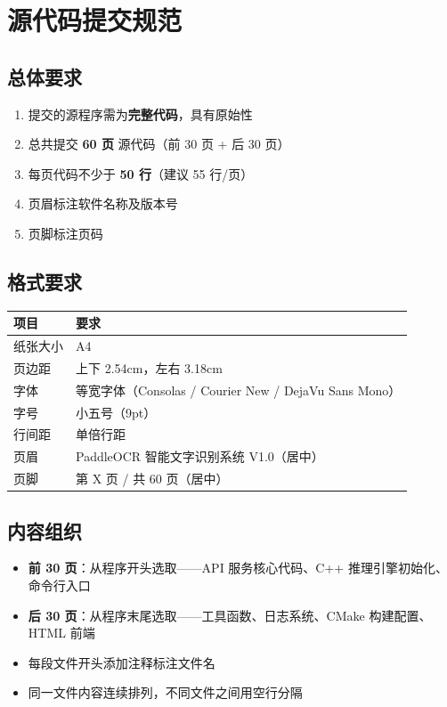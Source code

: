 \documentclass[12pt,a4paper]{ctexart}
\begin{document}
\section{源代码提交规范}

\subsection{总体要求}
\begin{enumerate}
    \item 提交的源程序需为\textbf{完整代码}，具有原始性
    \item 总共提交 \textbf{60 页} 源代码（前 30 页 + 后 30 页）
    \item 每页代码不少于 \textbf{50 行}（建议 55 行/页）
    \item 页眉标注软件名称及版本号
    \item 页脚标注页码
\end{enumerate}

\subsection{格式要求}
\begin{longtable}{|p{3cm}|p{10cm}|}\hline
\textbf{项目} & \textbf{要求} \\\hline
纸张大小 & A4 \\\hline
页边距 & 上下 2.54cm，左右 3.18cm \\\hline
字体 & 等宽字体（Consolas / Courier New / DejaVu Sans Mono） \\\hline
字号 & 小五号（9pt） \\\hline
行间距 & 单倍行距 \\\hline
页眉 & PaddleOCR 智能文字识别系统 V1.0（居中） \\\hline
页脚 & 第 X 页 / 共 60 页（居中） \\\hline
\end{longtable}

\subsection{内容组织}
\begin{itemize}
    \item \textbf{前 30 页}：从程序开头选取——API 服务核心代码、C++ 推理引擎初始化、命令行入口
    \item \textbf{后 30 页}：从程序末尾选取——工具函数、日志系统、CMake 构建配置、HTML 前端
    \item 每段文件开头添加注释标注文件名
    \item 同一文件内容连续排列，不同文件之间用空行分隔
\end{itemize}
\end{document}
